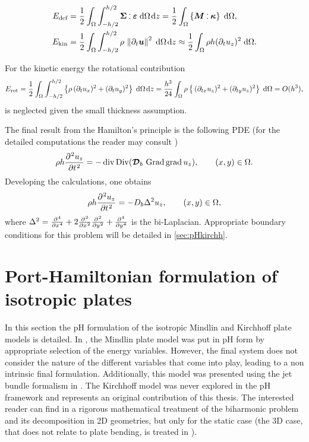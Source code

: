 \begin{align}
E_{\text{def}} &= \frac{1}{2} \int_{\Omega} \int_{-h/2}^{h/2} \bm{\Sigma} \cddot \bm{\varepsilon} \d{\Omega} \d{z} = \frac{1}{2} \int_{\Omega} \left\{\bm{M} \cddot \bm{\kappa}\right\}\d{\Omega}, \label{eq:defenKir}\\
E_{\text{kin}} &= \frac{1}{2}  \int_{\Omega} \int_{-h/2}^{h/2} \rho \, \norm{\partial_t \bm{u}}^2 \d{\Omega} \d{z} \approx \frac{1}{2} \int_{\Omega} \rho h (\partial_t u_z)^2  \d{\Omega}. \label{eq:kinenKir}
\end{align}
\begin{remark}\label{rmk:rotary}
For the kinetic energy the rotational contribution 
\begin{equation*}
E_{\text{rot}} =  \frac{1}{2}  \int_{\Omega} \int_{-h/2}^{h/2} \left\{\rho \, (\partial_t u_x)^2 + (\partial_t u_y)^2 \right\} \d{\Omega} \d{z} = \frac{h^3}{24} \int_{\Omega} \rho \left\{ \, (\partial_{tx} u_z)^2 + (\partial_{ty} u_z)^2 \right\} \d{\Omega} = O(h^3),
\end{equation*}
is neglected given the small thickness assumption.
\end{remark}
The final result from the Hamilton's principle is the following PDE (for the detailed computations the reader may consult \cite[Chapter 3]{reddy2006theory})
\begin{equation}\label{eq:classKir}
\rho h \diffp[2]{u_z}{t} = - \div\Div (\bm{\mathcal{D}}_b\, \Grad\grad{u_z}), \qquad (x,y) \in \Omega.
\end{equation}
Developing the calculations, one obtains
\begin{equation*}
\rho h \diffp[2]{u_z}{t} = - D_b \Delta^2 u_z, \qquad (x,y) \in \Omega,
\end{equation*}
where $\Delta^2 = \diffp[4]{}{x} + 2\diffp[2]{}{x}\diffp[2]{}{y} + \diffp[4]{}{y}$ is the bi-Laplacian. Appropriate boundary conditions for this problem will be detailed in \ref{sec:pHkirchh}.


\section{Port-Hamiltonian formulation of isotropic plates}
In this section the pH formulation of the isotropic Mindlin and Kirchhoff plate models is detailed. In \cite{macchelli2005mindlin}, the Mindlin plate model was put in pH form by appropriate selection of the energy variables. However, the final system does not consider the nature of the different variables that come into play, leading to a non intrinsic final formulation. Additionally, this model was presented using the jet bundle formalism in \cite{schoberl2017mindlin}. The Kirchhoff model was never explored in the pH framework and represents an original contribution of this thesis. The interested reader can find in \cite{rafetseder2018siam} a rigorous mathematical treatment of the biharmonic problem and its decomposition in 2D geometries, but only for the static case (the 3D case, that does not relate to plate bending, is treated in \cite{pauly2018divdiv}). 

